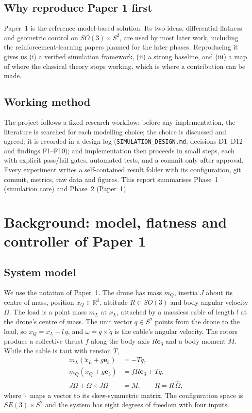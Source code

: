 \documentclass[11pt,a4paper]{article}
\newcommand{\R}{\mathbb{R}}
\newcommand{\ethree}{\mathbf{e}_3}
\newcommand{\code}[1]{\texttt{\small #1}}
\begin{document}
\subsection{Why reproduce Paper 1 first}
Paper~1 is the reference model-based solution. Its two ideas, differential flatness and geometric control on
$SO(3)\times S^2$, are used by most later work, including the reinforcement-learning papers planned for the later
phases. Reproducing it gives us (i) a verified simulation framework, (ii) a strong baseline, and (iii) a map of where
the classical theory stops working, which is where a contribution can be made.

\subsection{Working method}
The project follows a fixed research workflow: before any implementation, the literature is searched for each modelling
choice; the choice is discussed and agreed; it is recorded in a design log (\code{SIMULATION\_DESIGN.md}, decisions
D1--D12 and findings F1--F10); and implementation then proceeds in small steps, each with explicit pass/fail gates,
automated tests, and a commit only after approval. Every experiment writes a self-contained result folder with its
configuration, git commit, metrics, raw data and figures. This report summarises Phase~1 (simulation core) and
Phase~2 (Paper~1).

\section{Background: model, flatness and controller of Paper 1}
\label{sec:theory}

\subsection{System model}
We use the notation of Paper~1. The drone has mass $m_Q$, inertia $J$ about its centre of mass, position $x_Q\in\R^3$,
attitude $R\in SO(3)$ and body angular velocity $\Omega$. The load is a point mass $m_L$ at $x_L$, attached by a
massless cable of length $l$ at the drone's centre of mass. The unit vector $q\in S^2$ points from the drone to the load,
so $x_Q = x_L - l\,q$, and $\omega = q\times\dot q$ is the cable's angular velocity. The rotors produce a collective
thrust $f$ along the body axis $R\ethree$ and a body moment $M$. While the cable is taut with tension $T$,
\begin{align}
m_L(\ddot x_L + g\ethree) &= -T q, \label{eq:load}\\
m_Q(\ddot x_Q + g\ethree) &= f R\ethree + T q, \label{eq:quad}\\
J\dot\Omega + \Omega\times J\Omega &= M,\qquad \dot R = R\,\hat\Omega, \label{eq:att}
\end{align}
where $\hat{\cdot}$ maps a vector to its skew-symmetric matrix. The configuration space is $SE(3)\times S^2$ and the
system has eight degrees of freedom with four inputs.
\end{document}
